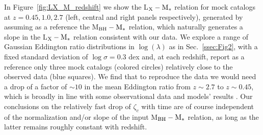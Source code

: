 In Figure~\ref{fig:LX_M_redshift} we show the L$_{\rm X}-{\rm M}_*$ relation for mock catalogs at $z=0.45,1.0,2.7$ (left, central and right panels respectively), generated by assuming as a reference the \citet{2015ApJ...813...82R} M$_{\rm BH}-{\rm M}_*$ relation, which naturally generates a slope in the L$_{\rm X}-{\rm M}_*$ relation consistent with our data. 
We explore a range of Gaussian Eddington ratio distributions in $\log(\lambda)$ as in Sec.~\ref{ssec:Fig2}, with a fixed standard deviation of $\log \sigma=0.3$ dex and, at each redshift, report as a reference only three mock catalogs (colored circles) relatively close to the observed data (blue squares). We find that to reproduce the data we would need a drop of a factor of $\sim 10$ in the mean Eddington ratio from $z\sim 2.7$ to $z\sim 0.45$, which is broadly in line with some observational data and models' results \citep[see, e.g., Fig. 12 in][]{Shankar13Acc}. Our conclusions on the relatively fast drop of $\zeta_c$ with time are of course independent of the normalization and/or slope of the input M$_{\rm BH}-{\rm M}_*$ relation, as long as the latter remains roughly constant with redshift. 

